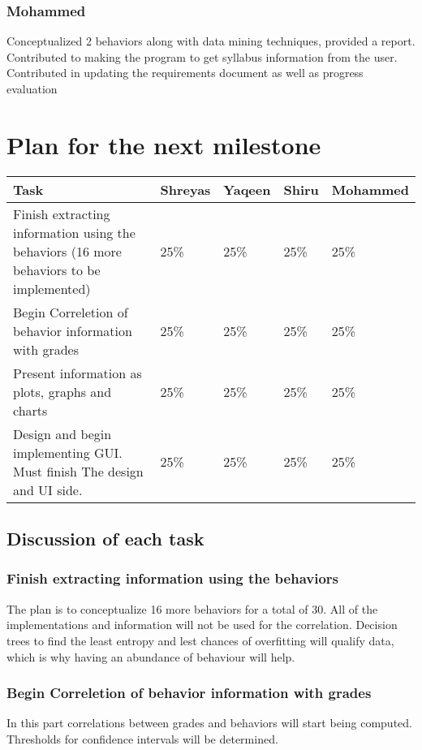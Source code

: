 \documentclass[12pt]{article}
\begin{document}
	\subsubsection{Mohammed}
	Conceptualized 2 behaviors along with data mining techniques, provided a report. Contributed to making the program to get syllabus information from the user. Contributed in updating the requirements document as well as progress evaluation
	\section{Plan for the next milestone}
	\begin{tabularx}{\linewidth}{|X|X|X|X|X|}
	\hline
	\textbf{Task} & \textbf{Shreyas} & \textbf{Yaqeen} & \textbf{Shiru} & \textbf{Mohammed} \\ \hline
	Finish extracting information using the behaviors (16 more behaviors to be implemented) & 25\% & 25\% & 25\% & 25\% \\ \hline
	Begin Correletion of behavior information with grades & 25\% & 25\% & 25\% & 25\% \\ \hline
	Present information as plots, graphs and charts & 25\% & 25\% & 25\% & 25\% \\ \hline
	Design and begin implementing GUI. Must finish The design and UI side. & 25\% & 25\% & 25\% & 25\% \\ \hline
	\end{tabularx}

	\subsection{Discussion of each task}
	\subsubsection{Finish extracting information using the behaviors}
	The plan is to conceptualize 16 more behaviors for a total of 30. All of the implementations and information will not be used for the correlation. Decision trees to find the least entropy and lest chances of overfitting will qualify data, which is why having an abundance of behaviour will help. 
	\subsubsection{Begin Correletion of behavior information with grades}
	In this part correlations between grades and behaviors will start being computed. Thresholds for confidence intervals will be determined.
\end{document}
